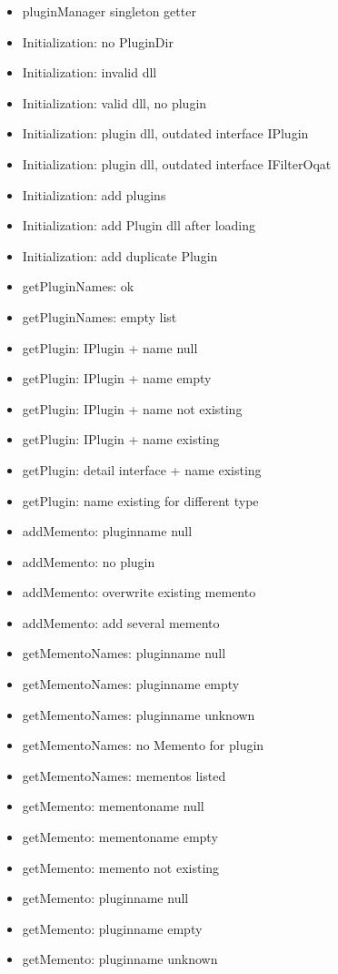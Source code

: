 \begin{itemize}
\item pluginManager singleton getter
\item Initialization: no PluginDir
\item Initialization: invalid dll
\item Initialization: valid dll, no plugin
\item Initialization: plugin dll, outdated interface IPlugin
\item Initialization: plugin dll, outdated interface IFilterOqat
\item Initialization: add plugins
\item Initialization: add Plugin dll after loading
\item Initialization: add duplicate Plugin

\item getPluginNames: ok
\item getPluginNames: empty list
\item getPlugin: IPlugin + name null
\item getPlugin: IPlugin + name empty
\item getPlugin: IPlugin + name not existing
\item getPlugin: IPlugin + name existing
\item getPlugin: detail interface + name existing
\item getPlugin: name existing for different type

\item addMemento: pluginname null
\item addMemento: no plugin
\item addMemento: overwrite existing memento
\item addMemento: add several memento
\item getMementoNames: pluginname null
\item getMementoNames: pluginname empty
\item getMementoNames: pluginname unknown
\item getMementoNames: no Memento for plugin
\item getMementoNames: mementos listed

\item getMemento: mementoname null
\item getMemento: mementoname empty
\item getMemento: memento not existing
\item getMemento: pluginname null
\item getMemento: pluginname empty
\item getMemento: pluginname unknown
\end{itemize}
